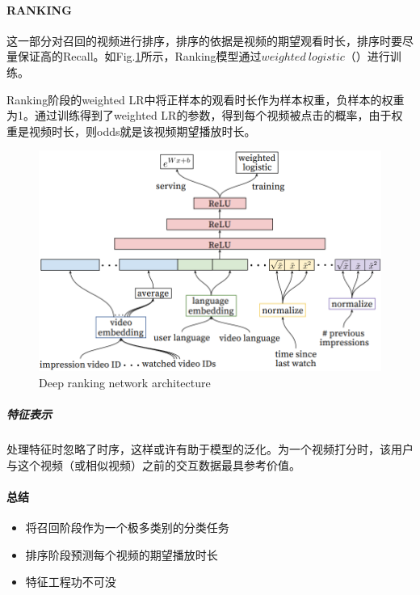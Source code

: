 \paragraph{RANKING}
这一部分对召回的视频进行排序，排序的依据是视频的期望观看时长，排序时要尽量保证高的Recall。如Fig.\ref{fig:ranking}所示，Ranking模型通过$weighted\:logistic$（）进行训练。

Ranking阶段的weighted LR中将正样本的观看时长作为样本权重，负样本的权重为1。通过训练得到了weighted LR的参数，得到每个视频被点击的概率，由于权重是视频时长，则odds就是该视频期望播放时长。

\begin{figure}[h]
	\centering
	\includegraphics[width=.8\textwidth]{pics/ranking.png}
	\caption{Deep ranking network architecture}
	\label{fig:ranking}
\end{figure}

\subparagraph{特征表示}处理特征时忽略了时序，这样或许有助于模型的泛化。为一个视频打分时，该用户与这个视频（或相似视频）之前的交互数据最具参考价值。

\paragraph{总结}

\begin{itemize}
	\item 将召回阶段作为一个极多类别的分类任务
	\item 排序阶段预测每个视频的期望播放时长
	\item 特征工程功不可没
\end{itemize}

